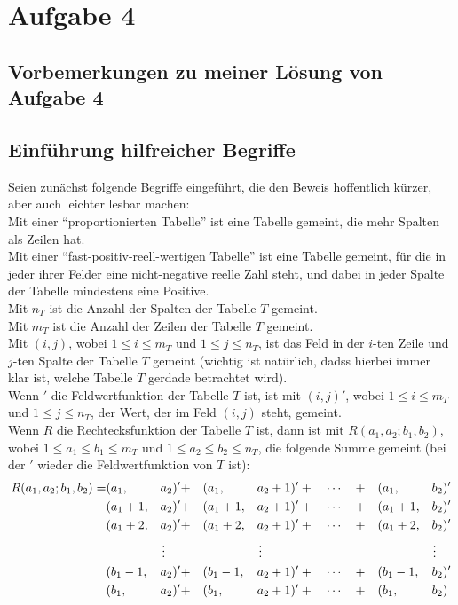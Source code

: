 \section{Aufgabe 4}

\subsection*{Vorbemerkungen zu meiner Lösung von Aufgabe 4}

\subsection*{Einführung hilfreicher Begriffe}

Seien zunächst folgende Begriffe eingeführt, die den Beweis hoffentlich kürzer, aber auch leichter lesbar machen:\\
Mit einer "`proportionierten Tabelle"' ist eine Tabelle gemeint, die mehr Spalten als Zeilen hat.\\
Mit einer "`fast-positiv-reell-wertigen Tabelle"' ist eine Tabelle gemeint, für die in jeder ihrer Felder eine nicht-negative 
reelle Zahl steht, und dabei in jeder Spalte der Tabelle mindestens eine Positive.\\
Mit $n_T$ ist die Anzahl der Spalten der Tabelle $T$ gemeint.\\
Mit $m_T$ ist die Anzahl der Zeilen der Tabelle $T$ gemeint.\\
Mit $(i, j)$, wobei $1 \leq i \leq m_T$ und $1 \leq j \leq n_T$, ist das Feld in der $i$-ten Zeile und $j$-ten 
Spalte der Tabelle $T$ gemeint (wichtig ist natürlich, dadss hierbei immer klar ist, welche Tabelle $T$ gerdade 
betrachtet wird).\\
Wenn $'$ die Feldwertfunktion der Tabelle $T$ ist, ist mit $(i, j)'$, wobei $1 \leq i \leq m_T$ und $1 \leq j \leq 
n_T$, der Wert, der im Feld $(i, j)$ steht, gemeint.\\
Wenn $R$ die Rechtecksfunktion der Tabelle $T$ ist, dann ist mit $R(a_1, a_2; b_1, b_2)$, wobei $1\leq a_1\leq b_1 
\leq m_T$ und $1 \leq a_2 \leq b_2 \leq n_T$,  die folgende Summe gemeint (bei der $'$ wieder die Feldwertfunktion 
von $T$ ist):
\begin{alignat*}{6}
    R(a_1, a_2; b_1, b_2) = &(a_1, &&a_2)' + &&(a_1, &&a_2+1)' + \quad \cdots \quad + &&(a_1, &&b_2)'\\
    &(a_1+1, &&a_2)' + &&(a_1+1, &&a_2+1)' +\quad \cdots \quad + &&(a_1+1, &&b_2)'\\
    &(a_1+2, &&a_2)' + &&(a_1+2, &&a_2+1)' +\quad \cdots \quad + &&(a_1+2, &&b_2)'\\
    & &&\vdotswithin{a} && &&\vdotswithin{a} && &&\vdotswithin{b} \\
    &(b_1-1, &&a_2)' + &&(b_1-1, &&a_2+1)' +\quad \cdots \quad + &&(b_1-1, &&b_2)'\\
    &(b_1, &&a_2)' + &&(b_1, &&a_2+1)' + \quad \cdots \quad + &&(b_1, &&b_2)
\end{alignat*}
